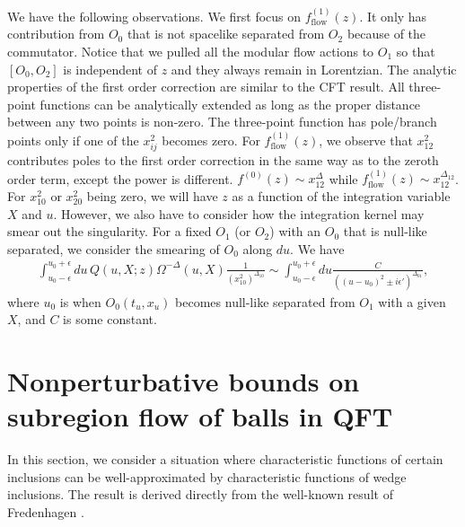 \documentclass[a4paper,11pt]{article}
\theoremstyle{definition}
\begin{document}
We have the following observations. We first focus on $f^{(1)}_{\text{flow}}(z)$. It only has contribution from $O_0$ that is not spacelike separated from $O_2$ because of the commutator. Notice that we pulled all the modular flow actions to $O_1$ so that $[O_0,O_2]$ is independent of $z$ and they always remain in Lorentzian.
The analytic properties of the first order correction are similar to the CFT result. All three-point functions can be analytically extended as long as the proper distance between any two points is non-zero. The three-point function has pole/branch points only if one of the $x_{ij}^2$ becomes zero. For $f^{(1)}_{\text{flow}}(z)$, we observe that $x_{12}^2$ contributes poles to the first order correction in the same way as to the zeroth order term, except the power is different. $f^{(0)}(z) \sim x_{12}^{\Delta}$ while $f^{(1)}_{\text{flow}}(z) \sim x_{12}^{\Delta_{12}}$. For $x_{10}^2 $ or $ x_{20}^2$ being zero, we will have $z$ as a function of the integration variable $X$ and $u$. However, we also have to consider how the integration kernel may smear out the singularity. For a fixed $O_1$ (or $O_2$) with an $O_0$ that is null-like separated, 
we consider the smearing of $O_0$ along $du$. We have
\begin{align}
      \int_{u_0-\epsilon}^{u_0+\epsilon} du \, Q(u,X;z) \Omega^{-\Delta}(u,X) \frac{1}{(x_{10}^2)^{\Delta_{10}}}\sim \int_{u_0-\epsilon}^{u_0+\epsilon} du \frac{C}{((u-u_0)^2\pm i\epsilon')^{\Delta_{01}}},
\end{align}
where $u_0$ is when $O_0(t_u,x_u)$ becomes null-like separated from $O_1$ with a given $X$, and $C$ is some constant. 





\section{Nonperturbative bounds on subregion flow of balls in QFT}\label{section:approx}

In this section, we consider a situation where characteristic functions of certain inclusions can be well-approximated by characteristic functions of wedge inclusions. The result is derived directly from the well-known result of Fredenhagen \cite{fredenhagen}.
\end{document}
